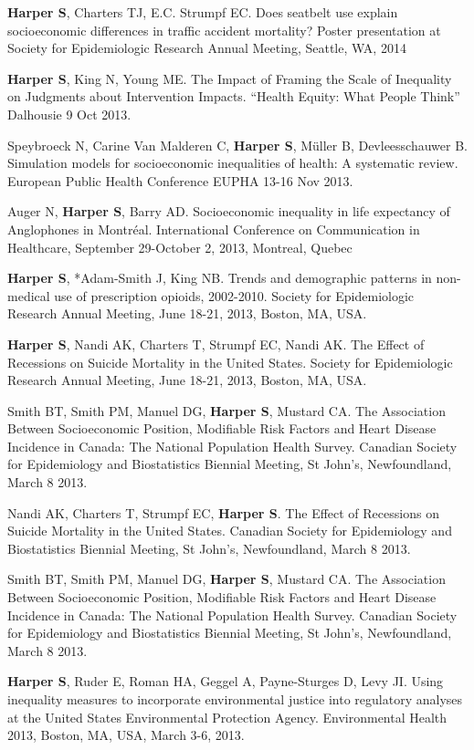 \documentclass[
  letterpaper,
  DIV=11,
  numbers=noendperiod]{scrartcl}
\begin{document}
\textbf{Harper S}, Charters TJ, E.C. Strumpf EC. Does seatbelt use
explain socioeconomic differences in traffic accident mortality? Poster
presentation at Society for Epidemiologic Research Annual Meeting,
Seattle, WA, 2014

\textbf{Harper S}, King N, Young ME. The Impact of Framing the Scale of
Inequality on Judgments about Intervention Impacts. ``Health Equity:
What People Think'' Dalhousie 9 Oct 2013.

Speybroeck N, Carine Van Malderen C, \textbf{Harper S}, Müller B,
Devleesschauwer B. Simulation models for socioeconomic inequalities of
health: A systematic review. European Public Health Conference EUPHA
13-16 Nov 2013.

Auger N, \textbf{Harper S}, Barry AD. Socioeconomic inequality in life
expectancy of Anglophones in Montréal. International Conference on
Communication in Healthcare, September 29-October 2, 2013, Montreal,
Quebec

\textbf{Harper S}, *Adam-Smith J, King NB. Trends and demographic
patterns in non-medical use of prescription opioids, 2002-2010. Society
for Epidemiologic Research Annual Meeting, June 18-21, 2013, Boston, MA,
USA.

\textbf{Harper S}, Nandi AK, Charters T, Strumpf EC, Nandi AK. The
Effect of Recessions on Suicide Mortality in the United States. Society
for Epidemiologic Research Annual Meeting, June 18-21, 2013, Boston, MA,
USA.

Smith BT, Smith PM, Manuel DG, \textbf{Harper S}, Mustard CA. The
Association Between Socioeconomic Position, Modifiable Risk Factors and
Heart Disease Incidence in Canada: The National Population Health
Survey. Canadian Society for Epidemiology and Biostatistics Biennial
Meeting, St John's, Newfoundland, March 8 2013.

Nandi AK, Charters T, Strumpf EC, \textbf{Harper S}. The Effect of
Recessions on Suicide Mortality in the United States. Canadian Society
for Epidemiology and Biostatistics Biennial Meeting, St John's,
Newfoundland, March 8 2013.

Smith BT, Smith PM, Manuel DG, \textbf{Harper S}, Mustard CA. The
Association Between Socioeconomic Position, Modifiable Risk Factors and
Heart Disease Incidence in Canada: The National Population Health
Survey. Canadian Society for Epidemiology and Biostatistics Biennial
Meeting, St John's, Newfoundland, March 8 2013.

\textbf{Harper S}, Ruder E, Roman HA, Geggel A, Payne-Sturges D, Levy
JI. Using inequality measures to incorporate environmental justice into
regulatory analyses at the United States Environmental Protection
Agency. Environmental Health 2013, Boston, MA, USA, March 3-6, 2013.
\end{document}
